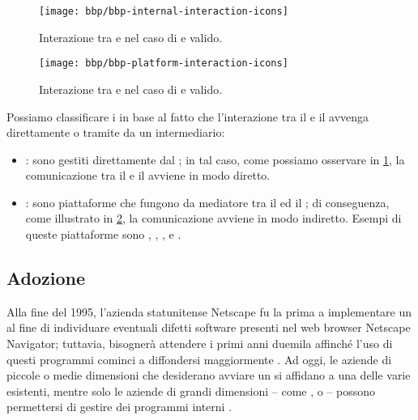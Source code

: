 \begin{figure}[tbhp]
\centering
\texttt{[image: bbp/bbp-internal-interaction-icons]}
\caption[Interazione nel caso di \internalBBP]{Interazione tra \BI e \BH nel caso di \internalBBP e \bugreport valido.}
\label{figure:bbp-internal}
\end{figure}

\begin{figure}[tbhp]
\centering
\texttt{[image: bbp/bbp-platform-interaction-icons]}
\caption[Interazione nel caso di \bugbountyplatform]{Interazione tra \BI e \BH nel caso di \bugbountyplatform e \bugreport valido.}
\label{figure:bbp-platform}
\end{figure}

Possiamo classificare i \BBP in base al fatto che l'interazione tra il \BI e il \BH avvenga direttamente o tramite da un intermediario:

\begin{itemize}

\item \InternalBBP: sono \BBP gestiti direttamente dal \BI \cite{hoffman2021bountychain}; in tal caso, come possiamo osservare in \cref{figure:bbp-internal}, la comunicazione tra il \BI e il \BH avviene in modo diretto.

\item \BugBountyPlatform: sono piattaforme che fungono da mediatore tra il \BI ed il \BH \cite{hoffman2021bountychain}; di conseguenza, come illustrato in \cref{figure:bbp-platform}, la comunicazione avviene in modo indiretto.
Esempi di queste piattaforme sono \HackerOne, \Intigriti, \Bugcrowd, \Synack e \Yogosha \cite{walshe2023bountythesis3, walshe2020bountypaper}. 

\end{itemize}

\subsection{Adozione}

Alla fine del 1995, l'azienda statunitense Netscape fu la prima a implementare un \BBP al fine di individuare eventuali difetti software presenti nel web browser Netscape Navigator; tuttavia, bisognerà attendere i primi anni duemila affinché l'uso di questi programmi cominci a diffondersi maggiormente \cite{hoffman2021bountychain}.
Ad oggi, le aziende di piccole o medie dimensioni che desiderano avviare un \BBP si affidano a una delle varie \bugbountyplatform esistenti, mentre solo le aziende di grandi dimensioni -- come \GoogleBBP, \MetaBBP o {\MicrosoftBBP} -- possono permettersi di gestire dei programmi interni \cite{walshe2023bountythesis3}.

